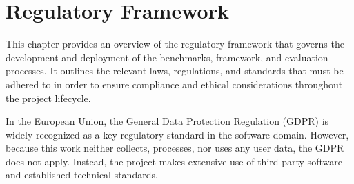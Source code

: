 \chapter{Regulatory Framework}\label{chap:regulation}

This chapter provides an overview of the regulatory framework that governs the development and deployment of the benchmarks, framework, and evaluation processes. It outlines the relevant laws, regulations, and standards that must be adhered to in order to ensure compliance and ethical considerations throughout the project lifecycle.

In the European Union, the General Data Protection Regulation (GDPR) \cite{gdpr} is widely recognized as a key regulatory standard in the software domain. However, because this work neither collects, processes, nor uses any user data, the GDPR does not apply. Instead, the project makes extensive use of third-party software and established technical standards.

